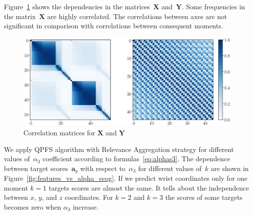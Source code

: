 \documentclass[12pt,twoside]{article}
\theoremstyle{definition}
\newcommand{\ba}{\mathbf{a}}
\newcommand{\bY}{\mathbf{Y}}
\newcommand{\bX}{\mathbf{X}}
\begin{document}
Figure~\ref{fig:corr_matrix} shows the dependencies in the matrices~$\bX$ and~$\bY$. Some frequencies in the matrix~$\bX$ are highly correlated.
The correlations between axes are not significant in comparison with correlations between consequent moments.
\begin{figure}
	\includegraphics[width=\linewidth]{figs/corr_matrix.eps}
	\caption{Correlation matrices for $\bX$ and $\bY$}
	\label{fig:corr_matrix}
\end{figure}

We apply QPFS algorithm with Relevance Aggregation strategy for different values of~$\alpha_3$ coefficient according to formulas~\eqref{eq:alphas3}.
The dependence between target scores~$\ba_y$ with respect to~$\alpha_3$ for different values of~$k$ are shown in Figure~\ref{fig:features_vs_alpha_ecog}.
If we predict wrist coordinates only for one moment $k = 1$ targets scores are almost the same.
It tells about the independence between $x$, $y$, and $z$ coordinates.
For $k = 2$ and $k = 3$ the scores of some targets becomes zero when $\alpha_3$ increase.
\end{document}
